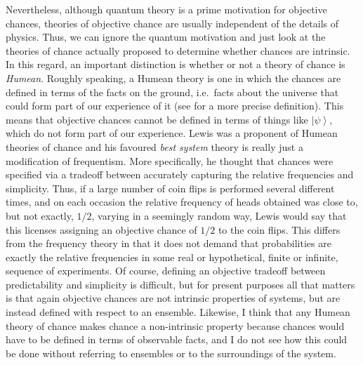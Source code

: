 \documentclass[DIV=calc,paper=a4,fontsize=11pt,twocolumn]{scrartcl} %
\theoremstyle{definition}
\theoremstyle{plain}
\newcommand{\Ket}[1]{\ensuremath{\left \vert #1 \right \rangle}}
\begin{document}
Nevertheless, although quantum theory is a prime motivation for
objective chances, theories of objective chance are usually
independent of the details of physics.  Thus, we can ignore the
quantum motivation and just look at the theories of chance actually
proposed to determine whether chances are intrinsic.  In this regard,
an important distinction is whether or not a theory of chance is
\emph{Humean}.  Roughly speaking, a Humean theory is one in which the
chances are defined in terms of the facts on the ground, i.e.\ facts
about the universe that could form part of our experience of it (see
\cite{Eagle2011} for a more precise definition).  This means that
objective chances cannot be defined in terms of things like
$\Ket{\psi}$, which do not form part of our experience.  Lewis
\cite{Lewis2011} was a proponent of Humean theories of chance and his
favoured \emph{best system} theory is really just a modification of
frequentism.  More specifically, he thought that chances were
specified via a tradeoff between accurately capturing the relative
frequencies and simplicity.  Thus, if a large number of coin flips is
performed several different times, and on each occasion the relative
frequency of heads obtained was close to, but not exactly, $1/2$,
varying in a seemingly random way, Lewis would say that this licenses
assigning an objective chance of $1/2$ to the coin flips.  This
differs from the frequency theory in that it does not demand that
probabilities are exactly the relative frequencies in some real or
hypothetical, finite or infinite, sequence of experiments.  Of course,
defining an objective tradeoff between predictability and simplicity
is difficult, but for present purposes all that matters is that again
objective chances are not intrinsic properties of systems, but are
instead defined with respect to an ensemble.  Likewise, I think that
any Humean theory of chance makes chance a non-intrinsic property
because chances would have to be defined in terms of observable facts,
and I do not see how this could be done without referring to ensembles
or to the surroundings of the system.
\end{document}
